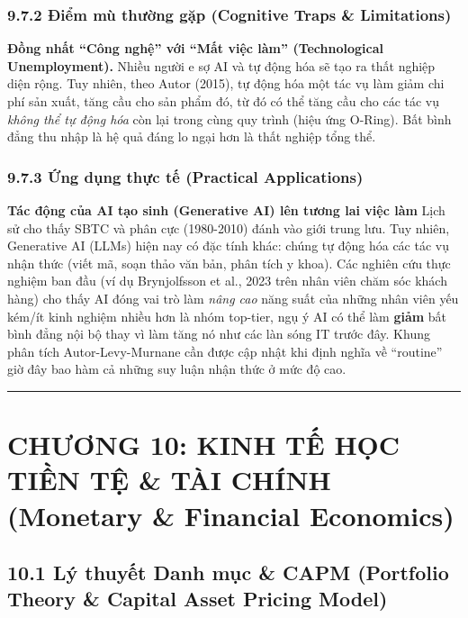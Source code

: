 \documentclass[
]{article}
\begin{document}
\subsubsection{9.7.2 Điểm mù thường gặp (Cognitive Traps \&
Limitations)}\label{ux111iux1ec3m-muxf9-thux1b0ux1eddng-gux1eb7p-cognitive-traps-limitations-75}

\textbf{Đồng nhất ``Công nghệ'' với ``Mất việc làm'' (Technological
Unemployment).} Nhiều người e sợ AI và tự động hóa sẽ tạo ra thất nghiệp
diện rộng. Tuy nhiên, theo Autor (2015), tự động hóa một tác vụ làm giảm
chi phí sản xuất, tăng cầu cho sản phẩm đó, từ đó có thể tăng cầu cho
các tác vụ \emph{không thể tự động hóa} còn lại trong cùng quy trình
(hiệu ứng O-Ring). Bất bình đẳng thu nhập là hệ quả đáng lo ngại hơn là
thất nghiệp tổng thể.

\subsubsection{9.7.3 Ứng dụng thực tế (Practical
Applications)}\label{ux1ee9ng-dux1ee5ng-thux1ef1c-tux1ebf-practical-applications-39}

\textbf{Tác động của AI tạo sinh (Generative AI) lên tương lai việc làm}
Lịch sử cho thấy SBTC và phân cực (1980-2010) đánh vào giới trung lưu.
Tuy nhiên, Generative AI (LLMs) hiện nay có đặc tính khác: chúng tự động
hóa các tác vụ nhận thức (viết mã, soạn thảo văn bản, phân tích y khoa).
Các nghiên cứu thực nghiệm ban đầu (ví dụ Brynjolfsson et al., 2023 trên
nhân viên chăm sóc khách hàng) cho thấy AI đóng vai trò làm \emph{nâng
cao} năng suất của những nhân viên yếu kém/ít kinh nghiệm nhiều hơn là
nhóm top-tier, ngụ ý AI có thể làm \textbf{giảm} bất bình đẳng nội bộ
thay vì làm tăng nó như các làn sóng IT trước đây. Khung phân tích
Autor-Levy-Murnane cần được cập nhật khi định nghĩa về ``routine'' giờ
đây bao hàm cả những suy luận nhận thức ở mức độ cao.

\begin{center}\rule{0.5\linewidth}{0.5pt}\end{center}

\section{CHƯƠNG 10: KINH TẾ HỌC TIỀN TỆ \& TÀI CHÍNH (Monetary \&
Financial
Economics)}\label{chux1b0ux1a1ng-10-kinh-tux1ebf-hux1ecdc-tiux1ec1n-tux1ec7-tuxe0i-chuxednh-monetary-financial-economics}

\subsection{10.1 Lý thuyết Danh mục \& CAPM (Portfolio Theory \& Capital
Asset Pricing
Model)}\label{luxfd-thuyux1ebft-danh-mux1ee5c-capm-portfolio-theory-capital-asset-pricing-model}
\end{document}
